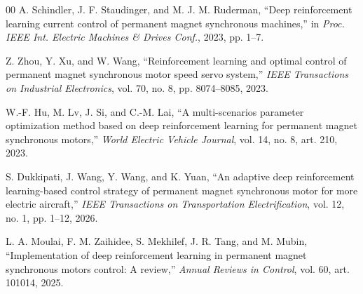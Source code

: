 \documentclass[conference]{IEEEtran}
\begin{document}
\begin{thebibliography}{00}
A. Schindler, J. F. Staudinger, and M. J. M. Ruderman, ``Deep reinforcement learning current control of permanent magnet synchronous machines,'' in \emph{Proc. IEEE Int. Electric Machines \& Drives Conf.}, 2023, pp. 1--7.

Z. Zhou, Y. Xu, and W. Wang, ``Reinforcement learning and optimal control of permanent magnet synchronous motor speed servo system,'' \emph{IEEE Transactions on Industrial Electronics}, vol. 70, no. 8, pp. 8074--8085, 2023.

W.-F. Hu, M. Lv, J. Si, and C.-M. Lai, ``A multi-scenarios parameter optimization method based on deep reinforcement learning for permanent magnet synchronous motors,'' \emph{World Electric Vehicle Journal}, vol. 14, no. 8, art. 210, 2023.

S. Dukkipati, J. Wang, Y. Wang, and K. Yuan, ``An adaptive deep reinforcement learning-based control strategy of permanent magnet synchronous motor for more electric aircraft,'' \emph{IEEE Transactions on Transportation Electrification}, vol. 12, no. 1, pp. 1--12, 2026.

L. A. Moulai, F. M. Zaihidee, S. Mekhilef, J. R. Tang, and M. Mubin, ``Implementation of deep reinforcement learning in permanent magnet synchronous motors control: A review,'' \emph{Annual Reviews in Control}, vol. 60, art. 101014, 2025.

\end{thebibliography}
\end{document}
